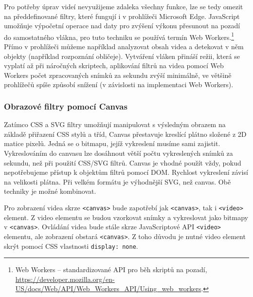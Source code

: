 Pro potřeby úprav videí nevyužijeme zdaleka všechny funkce, lze se tedy omezit na předdefinované filtry, které fungují i v prohlížeči Microsoft Edge. JavaScript umožňuje výpočetní operace nad daty pro zvýšení výkonu přesunout na pozadí do samostatného vlákna, pro tuto techniku se používá termín Web Workers.\footnote{Web Workers -- standardizované API pro běh skriptů na pozadí, \url{https://developer.mozilla.org/en-US/docs/Web/API/Web_Workers_API/Using_web_workers}.} Přímo v prohlížeči můžeme například analyzovat obsah videa a detekovat v něm objekty (například rozpoznání obličeje). Vytváření vláken přináší režii, která se vyplatí až při náročných skriptech, aplikování filtrů na videa pomocí Web Workers počet zpracovaných snímků za sekundu zvýší minimálně, ve většině prohlížečů spíše způsobí snížení (v závislosti na implementaci Web Workers). 

\subsubsection{Obrazové filtry pomocí Canvas}
Zatímco CSS a SVG filtry umožňují manipulovat s výsledným obrazem na základě přiřazení CSS stylů a tříd, Canvas přestavuje kreslící plátno složené z 2D matice pixelů. Jedná se o bitmapu, jejíž vykreslení musíme sami zajistit. Vykreslováním do canvasu lze dosáhnout větší počtu vykreslených snímků za sekundu, než při použití CSS/SVG filtrů. Canvas je vhodné použít vždy, pokud nepotřebujeme přístup k objektům filtrů pomocí DOM. Rychlost vykreslení závisí na velikosti plátna. Při velkém formátu je výhodnější SVG, než canvas. Obě techniky je možné kombinovat.

Pro zobrazení videa skrze \texttt{<canvas>} bude zapotřebí jak \texttt{<canvas>}, tak i \texttt{<video>} element. Z video elementu se budou vzorkovat snímky a vykreslovat jako bitmapy v \texttt{<canvas>}. Ovládání videa bude stále skrze JavaScriptové API \texttt{<video>} elementu, ale zobrazení obstará \texttt{<canvas>}. Z toho důvodu je nutné video element skrýt pomocí CSS vlastnosti \texttt{display: none}.

